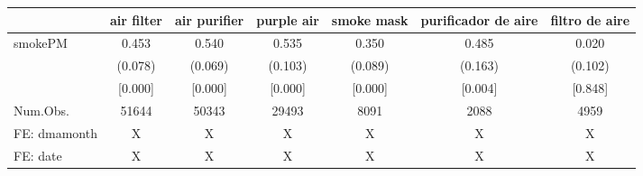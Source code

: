 \begin{table}
\centering
\begin{tabular}[t]{lcccccc}
\toprule
  & air filter & air purifier & purple air & smoke mask & purificador de aire & filtro de aire\\
\midrule
smokePM & 0.453 & 0.540 & 0.535 & 0.350 & 0.485 & 0.020\\
 & (0.078) & (0.069) & (0.103) & (0.089) & (0.163) & (0.102)\\
 & {}[0.000] & {}[0.000] & {}[0.000] & {}[0.000] & {}[0.004] & {}[0.848]\\
\midrule
Num.Obs. & 51644 & 50343 & 29493 & 8091 & 2088 & 4959\\
FE: dmamonth & X & X & X & X & X & X\\
FE: date & X & X & X & X & X & X\\
\bottomrule
\end{tabular}
\end{table}
